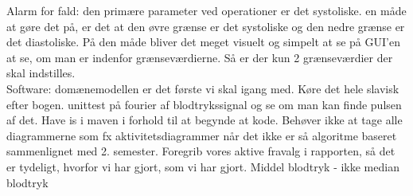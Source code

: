 \begin{enumerate}
	Alarm for fald: den primære parameter ved operationer er det systoliske. en måde at gøre det på, er det at den øvre grænse er det systoliske og den nedre grænse er det diastoliske. På den måde bliver det meget visuelt og simpelt at se på GUI’en at se, om man er indenfor grænseværdierne. Så er der kun 2 grænseværdier der skal indstilles. \\
	
	Software: domænemodellen er det første vi skal igang med. Køre det hele slavisk efter bogen. unittest på fourier af blodtrykssignal og se om man kan finde pulsen af det. Have is i maven i forhold til at begynde at kode. Behøver ikke at tage alle diagrammerne som fx aktivitetsdiagrammer når det ikke er så algoritme baseret sammenlignet med 2. semester. Foregrib vores aktive fravalg i rapporten, så det er tydeligt, hvorfor vi har gjort, som vi har gjort. Middel blodtryk - ikke median blodtryk
	
\end{enumerate}

\clearpage
